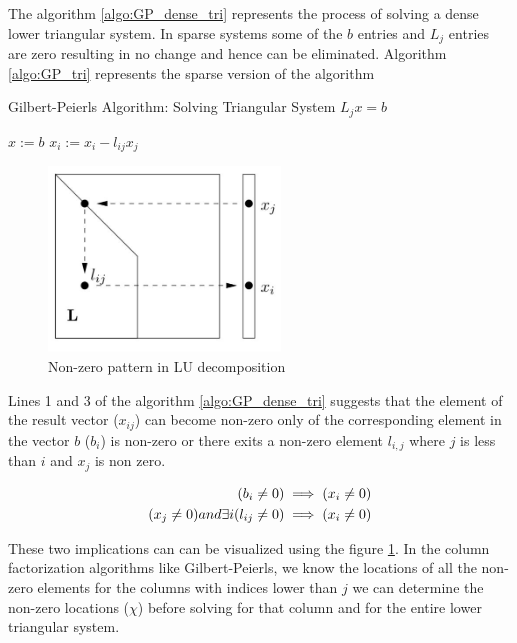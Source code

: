 The algorithm \ref{algo:GP_dense_tri} represents the process of solving a dense 
lower triangular system. In sparse systems some of the $b$ entries and $L_j$ entries
are zero resulting in no change and hence can be eliminated. Algorithm \ref{algo:GP_tri} 
represents the sparse version of the algorithm 

\begin{algorithm}
    \caption{Gilbert-Peierls Algorithm: Solving Triangular System $L_j x = b$
        \label{algo:GP_tri}}
    \begin{algorithmic}[1]
        \Statex
        \State $x := b$
                \State $x_i := x_i - l_{ij} x_j$
            \EndFor
        \EndFor
    \end{algorithmic}
\end{algorithm}

\begin{figure}[H]
    \centering
    \includegraphics[width = 0.55\textwidth]{./Theory/nnzPattern.JPG}
    \caption{Non-zero pattern in LU decomposition}
    \label{fig:GP:nnzPattern}
\end{figure}

\pagebreak

Lines 1 and 3 of the algorithm \ref{algo:GP_dense_tri} suggests that the element
of the result vector ($x_{ij}$) can become non-zero only of the corresponding element in the
vector $b$ ($b_{i}$) is non-zero or there exits a non-zero element $l_{i,j}$ where 
$j$ is less than $i$ and $x_{j}$ is non zero. 

\begin{subequations}
    \centering
    \begin{align}
        (b_i \neq 0) &\implies (x_i \neq 0) \\
        (x_j \neq 0) and \exists i(l_{ij} \neq 0) &\implies (x_i \neq 0)
    \end{align}
    \label{eqn:GP:findingX}
\end{subequations}

These two implications can can be visualized using the figure \ref{fig:GP:nnzPattern}.
In the column factorization algorithms like Gilbert-Peierls, we know the locations of all the 
non-zero elements for the columns with indices lower than $j$ we can determine 
the non-zero locations ($\chi$) before solving for that column and for the entire
lower triangular system.



